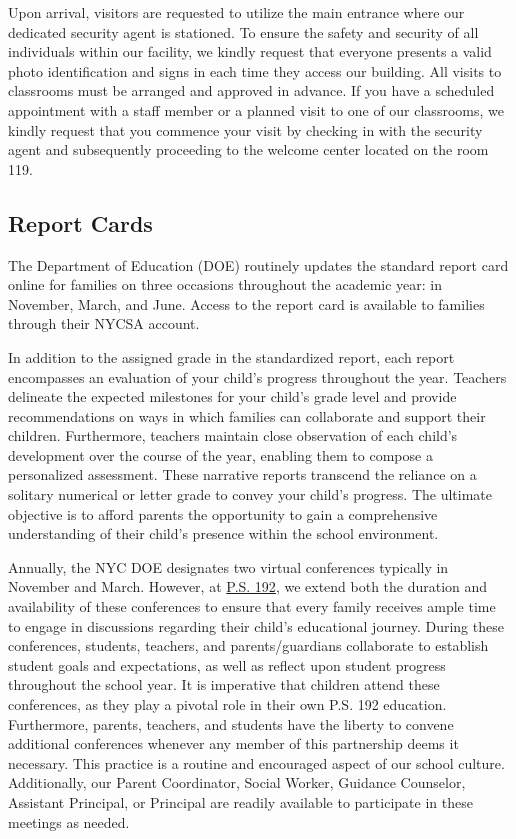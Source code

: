\documentclass[11pt, letterpaper]{article}
\begin{document}
Upon arrival, visitors are requested to utilize the main entrance where our dedicated security agent is stationed. To ensure the safety and security of all individuals within our facility, we kindly request that everyone presents a valid photo identification and signs in each time they access our building. All visits to classrooms must be arranged and approved in advance. If you have a scheduled appointment with a staff member or a planned visit to one of our classrooms, we kindly request that you commence your visit by checking in with the security agent and subsequently proceeding to the welcome center located on the room 119.

\subsection{Report Cards}
The Department of Education (DOE) routinely updates the standard report card online for families on three occasions throughout the academic year: in November, March, and June. Access to the report card is available to families through their NYCSA account.

In addition to the assigned grade in the standardized report, each report encompasses an evaluation of your child's progress throughout the year. Teachers delineate the expected milestones for your child's grade level and provide recommendations on ways in which families can collaborate and support their children. Furthermore, teachers maintain close observation of each child's development over the course of the year, enabling them to compose a personalized assessment. These narrative reports transcend the reliance on a solitary numerical or letter grade to convey your child's progress. The ultimate objective is to afford parents the opportunity to gain a comprehensive understanding of their child's presence within the school environment.

Annually, the NYC DOE designates two virtual conferences typically in November and March. However, at \href{https://www.ps192.org}{P.S. 192}, we extend both the duration and availability of these conferences to ensure that every family receives ample time to engage in discussions regarding their child's educational journey. During these conferences, students, teachers, and parents/guardians collaborate to establish student goals and expectations, as well as reflect upon student progress throughout the school year. It is imperative that children attend these conferences, as they play a pivotal role in their own P.S. 192 education. Furthermore, parents, teachers, and students have the liberty to convene additional conferences whenever any member of this partnership deems it necessary. This practice is a routine and encouraged aspect of our school culture. Additionally, our Parent Coordinator, Social Worker, Guidance Counselor, Assistant Principal, or Principal are readily available to participate in these meetings as needed. 
\end{document}
